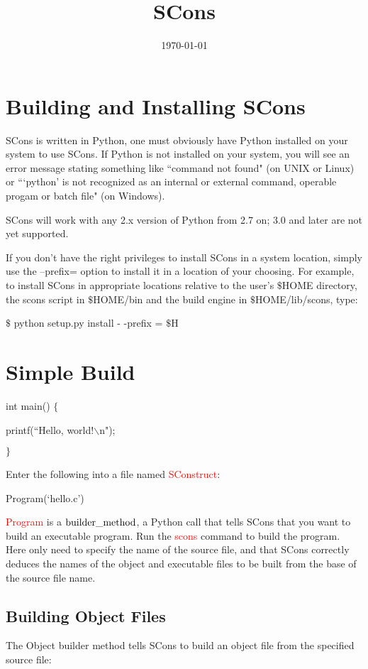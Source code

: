 \documentclass[12pt,a4paper]{article}
\title{SCons}
\author{}
\date{\today}
\begin{document}
\maketitle
\section{Building and Installing SCons}
SCons is written in Python, one must obviously have Python installed on your system to use SCons. If Python is not installed on your system, you will see an error message stating something like ``command not found" (on UNIX or Linux) or ```python' is not recognized as an internal or external command, operable progam or batch file" (on Windows).

SCons will work with any 2.x version of Python from 2.7 on; 3.0 and later are not yet supported.


If you don't have the right privileges to install SCons in a system location, simply use the --prefix= option to install it in a location of your choosing. For example, to install SCons in appropriate locations relative to the user's $\$$HOME directory, the scons script in $\$$HOME/bin and the build engine in $\$$HOME/lib/scons, type:

$\$$ python setup.py install - -prefix = $\$$H

\section{Simple Build}

int main() $\{$

    printf(``Hello, world!$\backslash$n");

$\}$

Enter the following into a file named \textcolor{red}{SConstruct}:

Program(`hello.c')

\textcolor{red}{Program} is a $\rm builder\_method$, a Python call that tells SCons that you want to build an executable program. Run the \textcolor{red}{scons} command to build the program. Here only need to specify the name of the source file, and that SCons correctly deduces the names of the object and executable files to be built from the base of the source file name.

\subsection{Building Object Files}
The Object builder method tells SCons to build an object file from the specified source file:
\end{document}
